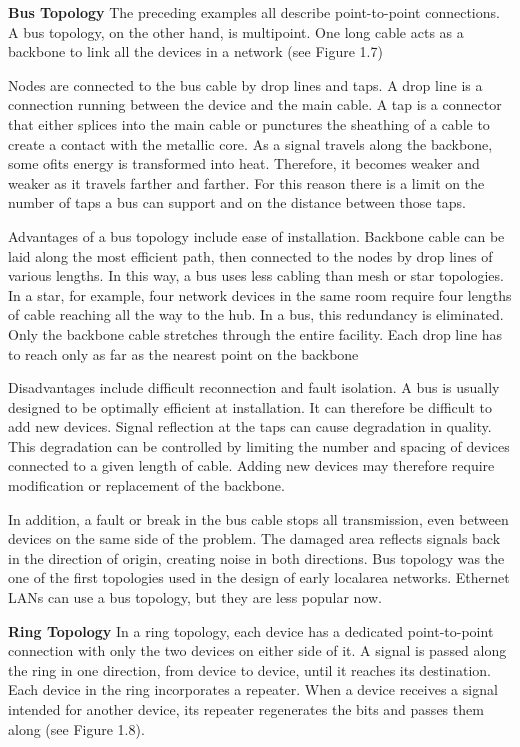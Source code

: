 \textbf{Bus Topology} The preceding examples all describe point-to-point connections. A bus topology, on the other hand, is multipoint. One long cable acts as a backbone to link all the devices in a network (see Figure 1.7)

Nodes are connected to the bus cable by drop lines and taps. A drop line is a connection running between the device and the main cable. A tap is a connector that either splices into the main cable or punctures the sheathing of a cable to create a contact with the metallic core. As a signal travels along the backbone, some ofits energy is transformed into heat. Therefore, it becomes weaker and weaker as it travels farther and farther. For this reason there is a limit on the number of taps a bus can support and on the distance between those taps.

Advantages of a bus topology include ease of installation. Backbone cable can be laid along the most efficient path, then connected to the nodes by drop lines of various lengths. In this way, a bus uses less cabling than mesh or star topologies. In a star, for example, four network devices in the same room require four lengths of cable reaching all the way to the hub. In a bus, this redundancy is eliminated. Only the backbone cable stretches through the entire facility. Each drop line has to reach only as far as the nearest point on the backbone

Disadvantages include difficult reconnection and fault isolation. A bus is usually designed to be optimally efficient at installation. It can therefore be difficult to add new devices. Signal reflection at the taps can cause degradation in quality. This degradation can be controlled by limiting the number and spacing of devices connected to a given length of cable. Adding new devices may therefore require modification or replacement of the backbone.

In addition, a fault or break in the bus cable stops all transmission, even between devices on the same side of the problem. The damaged area reflects signals back in the direction of origin, creating noise in both directions. Bus topology was the one of the first topologies used in the design of early localarea networks. Ethernet LANs can use a bus topology, but they are less popular now.

\textbf{Ring Topology} In a ring topology, each device has a dedicated point-to-point connection with only the two devices on either side of it. A signal is passed along the ring in one direction, from device to device, until it reaches its destination. Each device in the ring incorporates a repeater. When a device receives a signal intended for another device, its repeater regenerates the bits and passes them along (see Figure 1.8).

